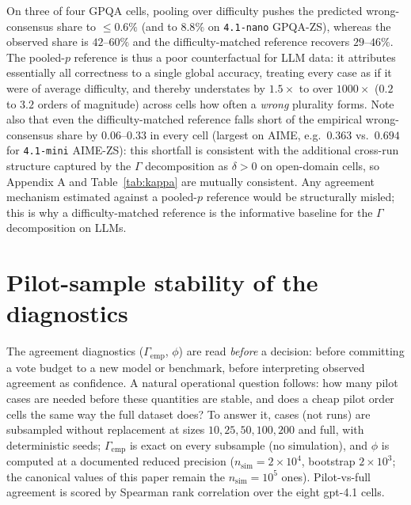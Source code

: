 \documentclass{article}
\newcommand{\agreementIndex}{\Gamma}
\begin{document}
On three of four GPQA cells, pooling over difficulty pushes the predicted
wrong-consensus share to $\le0.6\%$ (and to $8.8\%$ on
\texttt{4.1-nano} GPQA-ZS), whereas the observed share is
$42$--$60\%$ and the difficulty-matched reference recovers
$29$--$46\%$. The pooled-$p$ reference is thus a poor counterfactual for
LLM data: it attributes essentially all correctness to a single global
accuracy, treating every case as if it were of average difficulty, and thereby
understates by $1.5\times$ to over $1000\times$ ($0.2$ to $3.2$ orders of magnitude) across cells how often a \emph{wrong} plurality
forms. Note also that even the difficulty-matched reference falls short
of the empirical wrong-consensus share by
$0.06$--$0.33$ in every cell (largest on AIME, e.g.\ $0.363$ vs.\ $0.694$
for \texttt{4.1-mini} AIME-ZS): this shortfall is consistent with the additional cross-run
structure captured by the $\agreementIndex$ decomposition as $\delta>0$ on open-domain
cells, so Appendix A and Table~\ref{tab:kappa} are mutually consistent.
Any agreement mechanism estimated against a pooled-$p$ reference would be
structurally misled; this is why a difficulty-matched reference is the
informative baseline for the $\agreementIndex$ decomposition on LLMs.

\section{Pilot-sample stability of the diagnostics}
\label{app:pilot}

The agreement diagnostics ($\agreementIndex_{\mathrm{emp}}$, $\phi$) are read
\emph{before} a decision: before committing a vote budget to a new
model or benchmark, before interpreting observed agreement as
confidence. A natural operational question follows: how many pilot cases
are needed before these quantities are stable, and does a cheap pilot
order cells the same way the full dataset does? To answer it, cases (not
runs) are subsampled without replacement at sizes
$10,25,50,100,200$ and full, with deterministic seeds; $\agreementIndex_{\mathrm{emp}}$
is exact on every subsample (no simulation), and $\phi$ is computed at a
documented reduced precision ($n_{\mathrm{sim}}=2\times10^4$, bootstrap
$2\times10^3$; the canonical values of this paper remain the
$n_{\mathrm{sim}}=10^5$ ones). Pilot-vs-full agreement is scored by
Spearman rank correlation over the eight gpt-4.1 cells.
\end{document}
